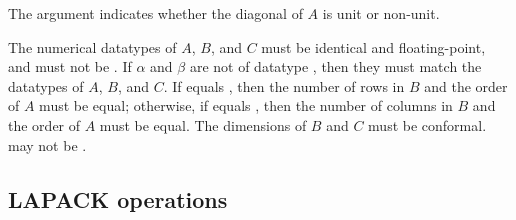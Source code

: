 \begin{flaspec}
{The \diag argument indicates whether the diagonal of $ A $ is unit or
non-unit.
}
\begin{checks}
\checkitem
The numerical datatypes of $ A $, $ B $, and $ C $ must be identical and
floating-point, and must not be \flaconstantns.
\itemvsp
\checkitem
If $ \alpha $ and $ \beta $ are not of datatype \flaconstantns, then they must
match the datatypes of $ A $, $ B $, and $ C $.
\itemvsp
\checkitem
If \side equals \flaleftns, then the number of rows in $ B $ and the order of
$ A $ must be equal; otherwise, if \side equals \flarightns, then the number
of columns in $ B $ and the order of $ A $ must be equal.
\itemvsp
\checkitem
The dimensions of $ B $ and $ C $ must be conformal.
\itemvsp
\checkitem
\diag may not be \flazerodiagns.
\end{checks}
\begin{params}
\end{params}
\end{flaspec}











\subsection{LAPACK operations}
\label{sec:lapack-front-ends}


